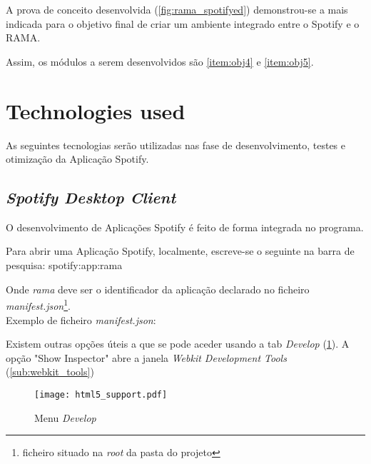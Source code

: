     A prova de conceito desenvolvida (\ref{fig:rama_spotifyed}) demonstrou-se a mais indicada para o objetivo final de criar um ambiente integrado entre o Spotify e o RAMA.

    Assim, os módulos a serem desenvolvidos são \ref{item:obj4} e \ref{item:obj5}.



\section{Technologies used} %
\label{sec:technologies}

  As seguintes tecnologias serão utilizadas nas fase de desenvolvimento, testes e otimização da Aplicação Spotify.

  \subsection{\emph{Spotify Desktop Client}} %
  \label{sub:subsection_name}
    O desenvolvimento de Aplicações Spotify é feito de forma integrada no programa.

    Para abrir uma Aplicação Spotify, localmente, escreve-se o seguinte na barra de pesquisa: spotify:app:rama

    Onde \emph{rama} deve ser o identificador da aplicação declarado no ficheiro \emph{manifest.json}\footnote{ficheiro situado na \emph{root} da pasta do projeto}. \\
    Exemplo de ficheiro \emph{manifest.json}:

    

    Existem outras opções úteis a que se pode aceder usando a tab \emph{Develop} (\ref{fig:html5_support}).
    A opção "Show Inspector" abre a janela \emph{Webkit Development Tools} (\ref{sub:webkit_tools})

    \begin{figure}
      \begin{center}
        \texttt{[image: html5\_support.pdf]}
      \end{center}
      \caption{Menu \emph{Develop}}
      \label{fig:html5_support}
    \end{figure}
  
